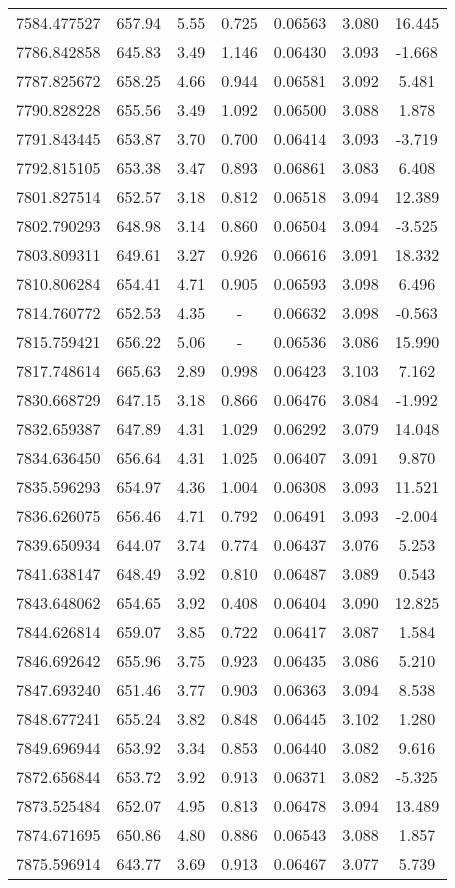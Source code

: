 \begin{table}
\begin{tabular}{ccccccc}
7584.477527 & 657.94 & 5.55 & 0.725 & 0.06563 & 3.080 & 16.445 \\
7786.842858 & 645.83 & 3.49 & 1.146 & 0.06430 & 3.093 & -1.668 \\
7787.825672 & 658.25 & 4.66 & 0.944 & 0.06581 & 3.092 & 5.481 \\
7790.828228 & 655.56 & 3.49 & 1.092 & 0.06500 & 3.088 & 1.878 \\
7791.843445 & 653.87 & 3.70 & 0.700 & 0.06414 & 3.093 & -3.719 \\
7792.815105 & 653.38 & 3.47 & 0.893 & 0.06861 & 3.083 & 6.408 \\
7801.827514 & 652.57 & 3.18 & 0.812 & 0.06518 & 3.094 & 12.389 \\
7802.790293 & 648.98 & 3.14 & 0.860 & 0.06504 & 3.094 & -3.525 \\
7803.809311 & 649.61 & 3.27 & 0.926 & 0.06616 & 3.091 & 18.332 \\
7810.806284 & 654.41 & 4.71 & 0.905 & 0.06593 & 3.098 & 6.496 \\
7814.760772 & 652.53 & 4.35 & - & 0.06632 & 3.098 & -0.563 \\
7815.759421 & 656.22 & 5.06 & - & 0.06536 & 3.086 & 15.990 \\
7817.748614 & 665.63 & 2.89 & 0.998 & 0.06423 & 3.103 & 7.162 \\
7830.668729 & 647.15 & 3.18 & 0.866 & 0.06476 & 3.084 & -1.992 \\
7832.659387 & 647.89 & 4.31 & 1.029 & 0.06292 & 3.079 & 14.048 \\
7834.636450 & 656.64 & 4.31 & 1.025 & 0.06407 & 3.091 & 9.870 \\
7835.596293 & 654.97 & 4.36 & 1.004 & 0.06308 & 3.093 & 11.521 \\
7836.626075 & 656.46 & 4.71 & 0.792 & 0.06491 & 3.093 & -2.004 \\
7839.650934 & 644.07 & 3.74 & 0.774 & 0.06437 & 3.076 & 5.253 \\
7841.638147 & 648.49 & 3.92 & 0.810 & 0.06487 & 3.089 & 0.543 \\
7843.648062 & 654.65 & 3.92 & 0.408 & 0.06404 & 3.090 & 12.825 \\
7844.626814 & 659.07 & 3.85 & 0.722 & 0.06417 & 3.087 & 1.584 \\
7846.692642 & 655.96 & 3.75 & 0.923 & 0.06435 & 3.086 & 5.210 \\
7847.693240 & 651.46 & 3.77 & 0.903 & 0.06363 & 3.094 & 8.538 \\
7848.677241 & 655.24 & 3.82 & 0.848 & 0.06445 & 3.102 & 1.280 \\
7849.696944 & 653.92 & 3.34 & 0.853 & 0.06440 & 3.082 & 9.616 \\
7872.656844 & 653.72 & 3.92 & 0.913 & 0.06371 & 3.082 & -5.325 \\
7873.525484 & 652.07 & 4.95 & 0.813 & 0.06478 & 3.094 & 13.489 \\
7874.671695 & 650.86 & 4.80 & 0.886 & 0.06543 & 3.088 & 1.857 \\
7875.596914 & 643.77 & 3.69 & 0.913 & 0.06467 & 3.077 & 5.739 \\
\hline
\end{tabular}
\end{table}
